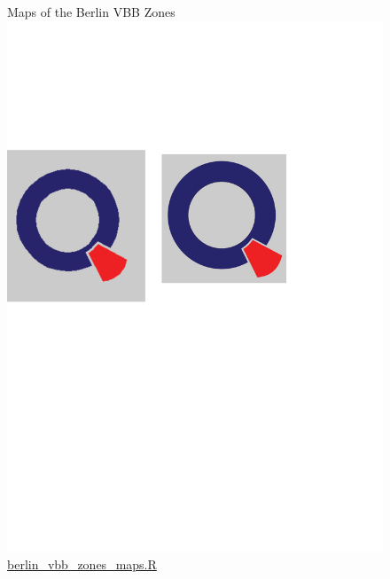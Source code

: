 \begin{figure}[H]
\centering
{}
\caption{Maps of the Berlin VBB Zones \protect\includegraphics[scale=0.05]{qletlogo.pdf} {\href{https://github.com/silvia-ventoruzzo/SPL-WISE-2018/blob/master/Berlin_VBB_Zones/berlin_vbb_zones_maps.R}{berlin\_vbb\_zones\_maps.R}}}
\centering
\end{figure}

